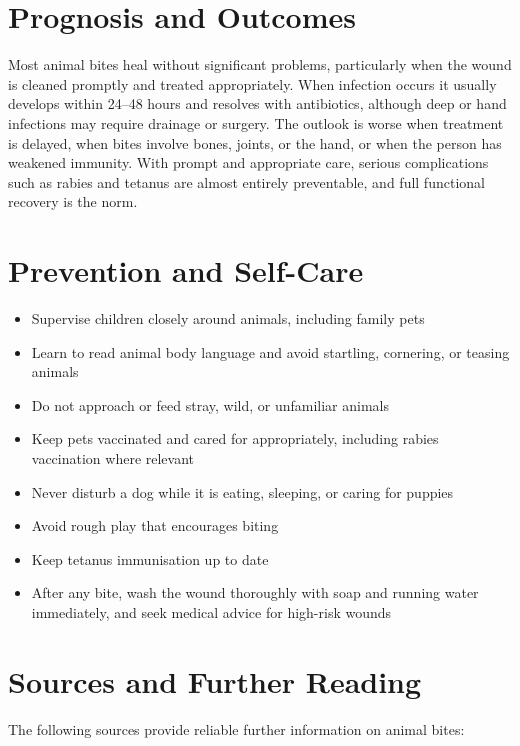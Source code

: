 \section*{Prognosis and Outcomes}
Most animal bites heal without significant problems, particularly when the wound is cleaned promptly and treated appropriately. When infection occurs it usually develops within 24--48 hours and resolves with antibiotics, although deep or hand infections may require drainage or surgery. The outlook is worse when treatment is delayed, when bites involve bones, joints, or the hand, or when the person has weakened immunity. With prompt and appropriate care, serious complications such as rabies and tetanus are almost entirely preventable, and full functional recovery is the norm.

\section*{Prevention and Self-Care}
\begin{itemize}
    \item Supervise children closely around animals, including family pets
    \item Learn to read animal body language and avoid startling, cornering, or teasing animals
    \item Do not approach or feed stray, wild, or unfamiliar animals
    \item Keep pets vaccinated and cared for appropriately, including rabies vaccination where relevant
    \item Never disturb a dog while it is eating, sleeping, or caring for puppies
    \item Avoid rough play that encourages biting
    \item Keep tetanus immunisation up to date
    \item After any bite, wash the wound thoroughly with soap and running water immediately, and seek medical advice for high-risk wounds
\end{itemize}

\section*{Sources and Further Reading}
The following sources provide reliable further information on animal bites:

